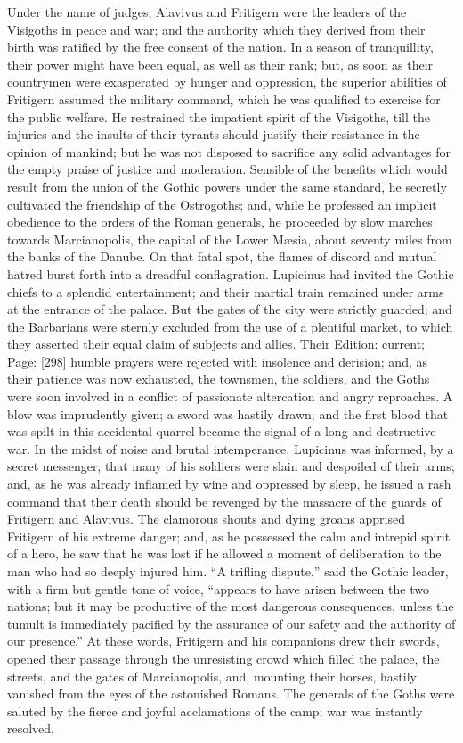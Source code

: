 Under the name of judges, Alavivus and Fritigern were the leaders of the Visigoths in peace and war; and the authority which they derived from their birth was ratified by the free consent of the nation. In a season of tranquillity, their power might have been equal, as well as their rank; but, as soon as their countrymen were exasperated by hunger and oppression, the superior abilities of Fritigern assumed the military command, which he was qualified to exercise for the public welfare. He restrained the impatient spirit of the Visigoths, till the injuries and the insults of their tyrants should justify their resistance in the opinion of mankind; but he was not disposed to sacrifice any solid advantages for the empty praise of justice and moderation. Sensible of the benefits which would result from the union of the Gothic powers under the same standard, he secretly cultivated the friendship of the Ostrogoths; and, while he professed an implicit obedience to the orders of the Roman generals, he proceeded by slow marches towards Marcianopolis, the capital of the Lower Mæsia, about seventy miles from the banks of the Danube. On that fatal spot, the flames of discord and mutual hatred burst forth into a dreadful conflagration. Lupicinus had invited the Gothic chiefs to a splendid entertainment; and their martial train remained under arms at the entrance of the palace. But the gates of the city were strictly guarded; and the Barbarians were sternly excluded from the use of a plentiful market, to which they asserted their equal claim of subjects and allies. Their Edition: current; Page: [298] humble prayers were rejected with insolence and derision; and, as their patience was now exhausted, the townsmen, the soldiers, and the Goths were soon involved in a conflict of passionate altercation and angry reproaches. A blow was imprudently given; a sword was hastily drawn; and the first blood that was spilt in this accidental quarrel became the signal of a long and destructive war. In the midst of noise and brutal intemperance, Lupicinus was informed, by a secret messenger, that many of his soldiers were slain and despoiled of their arms; and, as he was already inflamed by wine and oppressed by sleep, he issued a rash command that their death should be revenged by the massacre of the guards of Fritigern and Alavivus. The clamorous shouts and dying groans apprised Fritigern of his extreme danger; and, as he possessed the calm and intrepid spirit of a hero, he saw that he was lost if he allowed a moment of deliberation to the man who had so deeply injured him. \texthebrew{“}A trifling dispute,\texthebrew{}” said the Gothic leader, with a firm but gentle tone of voice, \texthebrew{“}appears to have arisen between the two nations; but it may be productive of the most dangerous consequences, unless the tumult is immediately pacified by the assurance of our safety and the authority of our presence.\texthebrew{}” At these words, Fritigern and his companions drew their swords, opened their passage through the unresisting crowd which filled the palace, the streets, and the gates of Marcianopolis, and, mounting their horses, hastily vanished from the eyes of the astonished Romans. The generals of the Goths were saluted by the fierce and joyful acclamations of the camp; war was instantly resolved, 